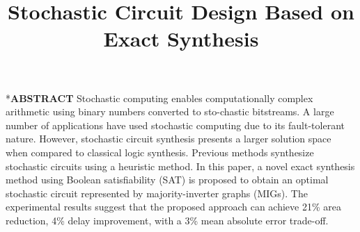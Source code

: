 \documentclass[conference,letterpaper]{IEEEtran}
\makeatletter
\renewcommand{\section}{\@startsection{section}{1}{0mm}
    {-\baselineskip}{0.001\baselineskip}{\bf\leftline}}
\makeatother
\begin{document}
\title{ \Large\textbf{ Stochastic Circuit Design Based on Exact Synthesis}\vspace{-1.2em} }
\author{
}

\maketitle
\section*{\textbf{\large ABSTRACT}}
Stochastic computing enables computationally complex arithmetic using binary numbers converted to sto-chastic bitstreams. A large number of applications have used stochastic computing due to its fault-tolerant nature. However, stochastic circuit synthesis presents a larger solution space when compared to classical logic synthesis. Previous methods synthesize stochastic circuits using a heuristic method. In this paper, a novel exact synthesis method using Boolean satisfiability (SAT) is proposed to obtain an optimal stochastic circuit represented by majority-inverter graphs (MIGs). The experimental results suggest that the proposed approach can achieve 21\% area reduction, 4\% delay improvement, with a 3\% mean absolute error trade-off.    
\vspace{3ex}

\end{document}
